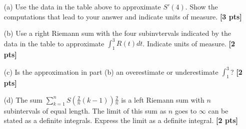 \documentclass{article}
\newcommand{\qspace}{\vspace*{1.7em}}
\begin{document}
    \begin{enumerate}
        
        \item[(a)] Use the data in the table above to approximate $S\prime(4)$. Show the computations that lead to your answer
                   and indicate units of measure. \textbf{[3 pts]} \qspace 
        \item[(b)] Use a right Riemann sum with the four subinvtervals indicated by the data in the table to 
                   approximate $\int_1^3 R(t)dt$. Indicate units of measure. \textbf{[2 pts]} \qspace
        \item[(c)] Is the approximation in part (b) an overestimate or underestimate $\int_1^3$? \textbf{[2 pts]} \qspace
        \item[(d)] The sum $\sum_{k = 1}^n S\left(\frac{2}{n}(k - 1)\right)\frac{2}{n}$ is a left Riemann sum with $n$ subintervals of equal length. 
                   The limit of this sum as $n$ goes to $\infty$ can be stated as a definite integrals. Express the limit as a definite integral. \textbf{[2 pts]}

    \end{enumerate}
\end{document}
